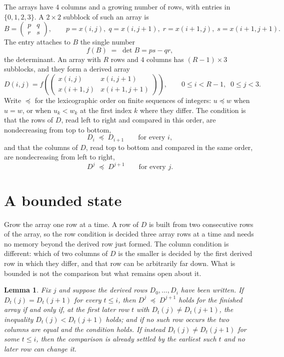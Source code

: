 \documentclass[11pt,a4paper]{article}
\theoremstyle{plain}
\newtheorem{lemma}[theorem]{Lemma}
\theoremstyle{definition}
\begin{document}
The arrays have $4$ columns and a growing number of rows, with entries in $\{0,1,2,3\}$. A
$2\times2$ subblock of such an array is
\[
B=\begin{pmatrix} p & q \\ r & s \end{pmatrix},
\qquad p=x(i,j),\; q=x(i,j+1),\; r=x(i+1,j),\; s=x(i+1,j+1).
\]
The entry attaches to $B$ the single number
\[
f(B)\;=\;\det B=ps-qr,
\]
the determinant. An array with $R$ rows and $4$ columns has $(R-1)\times3$ subblocks, and they
form a derived array
\[
D(i,j)=f\!\left(\begin{pmatrix} x(i,j) & x(i,j+1) \\ x(i+1,j) & x(i+1,j+1)\end{pmatrix}
\right),\qquad 0\le i<R-1,\;\; 0\le j<3 .
\]
Write $\preceq$ for the lexicographic order on finite sequences of integers: $u\preceq w$ when
$u=w$, or when $u_k<w_k$ at the first index $k$ where they differ. The condition is that the
rows of $D$, read left to right and compared in this order, are nondecreasing from top to bottom,
\[
D_{i}\;\preceq\;D_{i+1}\qquad\text{for every } i,
\]
and that the columns of $D$, read top to bottom and compared in the same order, are nondecreasing
from left to right,
\[
D^{j}\;\preceq\;D^{j+1}\qquad\text{for every } j .
\]

\section{A bounded state}

Grow the array one row at a time. A row of $D$ is built from two consecutive rows of the array,
so the row condition is decided three array rows at a time and needs no memory beyond the
derived row just formed. The column condition is different: which of two columns of $D$ is the
smaller is decided by the first derived row in which they differ, and that row can be
arbitrarily far down. What is bounded is not the comparison but what remains open about it.

\begin{lemma}\label{lem:bits}
Fix $j$ and suppose the derived rows $D_0,\dots,D_i$ have been written. If $D_t(j)=D_t(j+1)$ for
every $t\le i$, then $D^{j}\;\preceq\;D^{j+1}$ holds for the finished array if and only if,
at the first later row $t$ with $D_t(j)\neq D_t(j+1)$, the inequality $D_t(j)<D_t(j+1)$
holds; and if no such row occurs the two columns are equal and the condition holds. If instead
$D_t(j)\neq D_t(j+1)$ for some $t\le i$, then the comparison is already settled by the earliest
such $t$ and no later row can change it.
\end{lemma}
\end{document}

